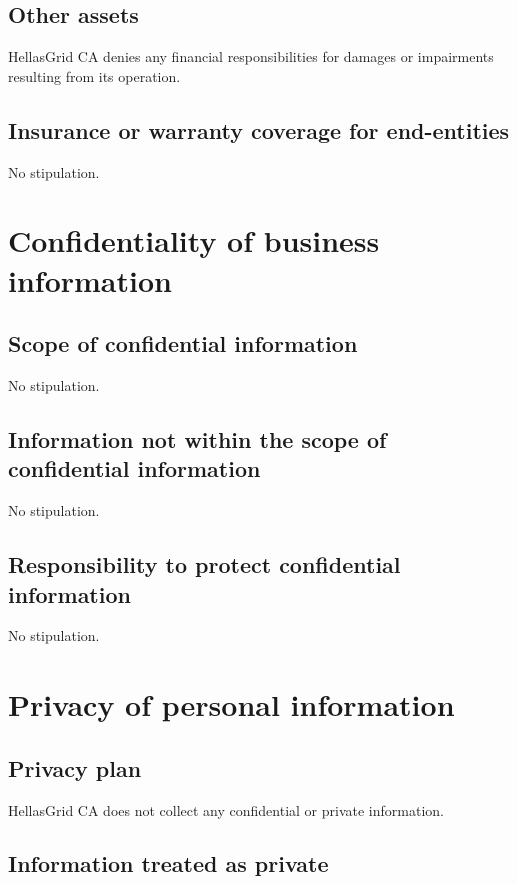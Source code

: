 \subsection{Other assets}

HellasGrid CA denies any financial responsibilities for damages or impairments resulting from its operation.


\subsection{Insurance or warranty coverage for end-entities}

No stipulation.


\section{Confidentiality of business information}

\subsection{Scope of confidential information}

No stipulation.

\subsection{Information not within the scope of confidential information}

No stipulation.

\subsection{Responsibility to protect confidential information}

No stipulation.

\section{Privacy of personal information}


\subsection{Privacy plan}

HellasGrid CA does not collect any confidential or private information.

\subsection{Information treated as private}

